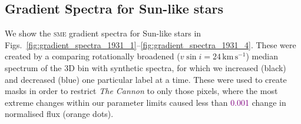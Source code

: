 \documentclass[
  journal=pasa,
  manuscript=research-paper, %
  year=2021,
  volume=37,
]{cup-journal}
\newcommand{\SB}[1]{{\textcolor{purple}{#1}}}
\newcommand{\TheCannon}{\textit{The Cannon}\xspace}
\newcommand{\sme}{\textsc{sme}\xspace}
\newcommand{\kms}{\,\mathrm{km\,s^{-1}}}	%
\begin{document}
\newpage

\subsection{Gradient Spectra for Sun-like stars}

We show the \sme gradient spectra for Sun-like stars in Figs.~\ref{fig:gradient_spectra_1931_1}--\ref{fig:gradient_spectra_1931_4}. These were created by a comparing rotationally broadened ($v \sin i = 24\kms$) median spectrum of the 3D bin with synthetic spectra, for which we increased (black) and decreased (blue) one particular label at a time. These were used to create masks in order to restrict \TheCannon to only those pixels, where the most extreme changes within our parameter limits caused less than \SB{0.001} change in normalised flux (orange dots).
\end{document}
